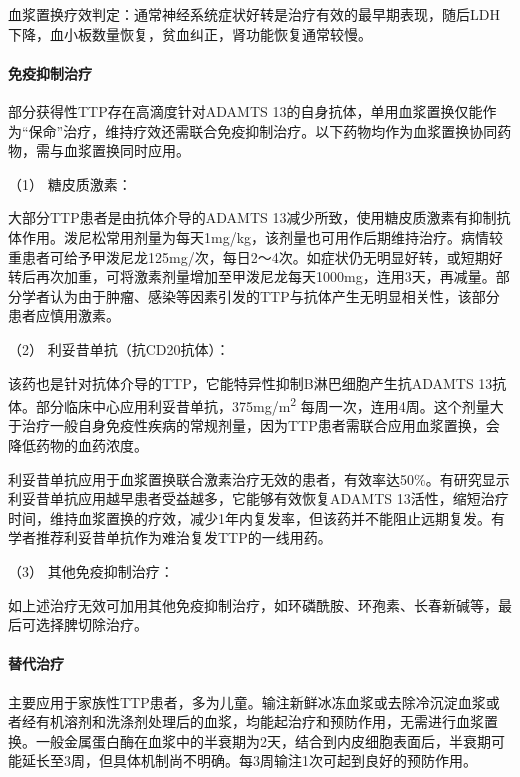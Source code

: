 血浆置换疗效判定：通常神经系统症状好转是治疗有效的最早期表现，随后LDH下降，血小板数量恢复，贫血纠正，肾功能恢复通常较慢。

\paragraph{免疫抑制治疗}

部分获得性TTP存在高滴度针对ADAMTS
13的自身抗体，单用血浆置换仅能作为“保命”治疗，维持疗效还需联合免疫抑制治疗。以下药物均作为血浆置换协同药物，需与血浆置换同时应用。

\hypertarget{text00334.htmlux5cux23CHP12-1-4-3-2-1}{}
（1） 糖皮质激素：

大部分TTP患者是由抗体介导的ADAMTS
13减少所致，使用糖皮质激素有抑制抗体作用。泼尼松常用剂量为每天1mg/kg，该剂量也可用作后期维持治疗。病情较重患者可给予甲泼尼龙125mg/次，每日2～4次。如症状仍无明显好转，或短期好转后再次加重，可将激素剂量增加至甲泼尼龙每天1000mg，连用3天，再减量。部分学者认为由于肿瘤、感染等因素引发的TTP与抗体产生无明显相关性，该部分患者应慎用激素。

\hypertarget{text00334.htmlux5cux23CHP12-1-4-3-2-2}{}
（2） 利妥昔单抗（抗CD20抗体）：

该药也是针对抗体介导的TTP，它能特异性抑制B淋巴细胞产生抗ADAMTS
13抗体。部分临床中心应用利妥昔单抗，375mg/m\textsuperscript{2}
每周一次，连用4周。这个剂量大于治疗一般自身免疫性疾病的常规剂量，因为TTP患者需联合应用血浆置换，会降低药物的血药浓度。

利妥昔单抗应用于血浆置换联合激素治疗无效的患者，有效率达50\%。有研究显示利妥昔单抗应用越早患者受益越多，它能够有效恢复ADAMTS
13活性，缩短治疗时间，维持血浆置换的疗效，减少1年内复发率，但该药并不能阻止远期复发。有学者推荐利妥昔单抗作为难治复发TTP的一线用药。

\hypertarget{text00334.htmlux5cux23CHP12-1-4-3-2-3}{}
（3） 其他免疫抑制治疗：

如上述治疗无效可加用其他免疫抑制治疗，如环磷酰胺、环孢素、长春新碱等，最后可选择脾切除治疗。

\paragraph{替代治疗}

主要应用于家族性TTP患者，多为儿童。输注新鲜冰冻血浆或去除冷沉淀血浆或者经有机溶剂和洗涤剂处理后的血浆，均能起治疗和预防作用，无需进行血浆置换。一般金属蛋白酶在血浆中的半衰期为2天，结合到内皮细胞表面后，半衰期可能延长至3周，但具体机制尚不明确。每3周输注1次可起到良好的预防作用。

